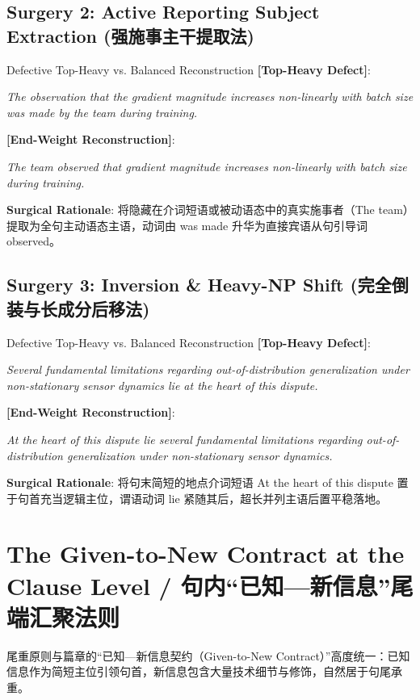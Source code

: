 \subsection{Surgery 2: Active Reporting Subject Extraction (强施事主干提取法)}
\begin{ExampleBox}{Defective Top-Heavy vs. Balanced Reconstruction}
\textbf{\color{TargetHighlight}[Top-Heavy Defect]}:\par\textit{The observation that the gradient magnitude increases non-linearly with batch size was made by the team during training.}\par\vspace{4pt}
\textbf{\color{AcadNavy}[End-Weight Reconstruction]}:\par\textit{The team observed that gradient magnitude increases non-linearly with batch size during training.}\par\vspace{4pt}
\textbf{Surgical Rationale}: 将隐藏在介词短语或被动语态中的真实施事者（The team）提取为全句主动语态主语，动词由 was made 升华为直接宾语从句引导词 observed。
\end{ExampleBox}
\vspace{4pt}
\subsection{Surgery 3: Inversion \& Heavy-NP Shift (完全倒装与长成分后移法)}
\begin{ExampleBox}{Defective Top-Heavy vs. Balanced Reconstruction}
\textbf{\color{TargetHighlight}[Top-Heavy Defect]}:\par\textit{Several fundamental limitations regarding out-of-distribution generalization under non-stationary sensor dynamics lie at the heart of this dispute.}\par\vspace{4pt}
\textbf{\color{AcadNavy}[End-Weight Reconstruction]}:\par\textit{At the heart of this dispute lie several fundamental limitations regarding out-of-distribution generalization under non-stationary sensor dynamics.}\par\vspace{4pt}
\textbf{Surgical Rationale}: 将句末简短的地点介词短语 At the heart of this dispute 置于句首充当逻辑主位，谓语动词 lie 紧随其后，超长并列主语后置平稳落地。
\end{ExampleBox}
\vspace{4pt}
\section{The Given-to-New Contract at the Clause Level / 句内“已知---新信息”尾端汇聚法则}
尾重原则与篇章的“已知---新信息契约（Given-to-New Contract）”高度统一：已知信息作为简短主位引领句首，新信息包含大量技术细节与修饰，自然居于句尾承重。

